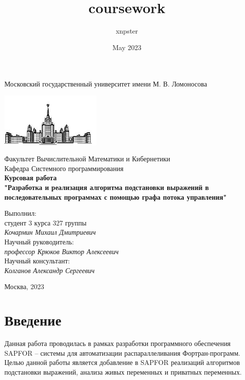 \documentclass{article}
\title{coursework}
\author{xnpster}
\date{May 2023}
\begin{document}
\lstset{style=mystyle}

\begin{titlepage}
\begin{center}
    Московский государственный университет имени М. В. Ломоносова

    \includegraphics[width=50mm]{msu_title.png}

    \bigskip
    Факультет Вычислительной Математики и Кибернетики\\
    Кафедра Системного программирования\\[10mm]
    
    \textsf{\large\bfseries
        Курсовая работа\\
        "Разработка и реализация алгоритма подстановки выражений в последовательных программах с помощью графа потока управления"\\[20mm]
    }
    
    \begin{flushright}
        \parbox{0.5\textwidth}{
        	Выполнил:\\
        	студент 3 курса 327 группы \\
        	\emph{Кочармин Михаил Дмитриевич}\\[5mm]
            Научный руководитель:\\
        	\emph{профессор Крюков Виктор Алексеевич} \\
            Научный консультант:\\
        	\emph{Колганов Александр Сергеевич} \\
    }
    \end{flushright}
    \vspace{\fill}
    Москва, 2023
\end{center}
\end{titlepage}

\newpage
\tableofcontents
\newpage

\section{Введение}
Данная работа проводилась в рамках разработки программного обеспечения SAPFOR 
-- системы для автоматизации распараллеливания Фортран-программ. Целью данной работы
является добавление в SAPFOR реализаций алгоритмов подстановки выражений, анализа живых переменных и приватных переменных.
\end{document}
